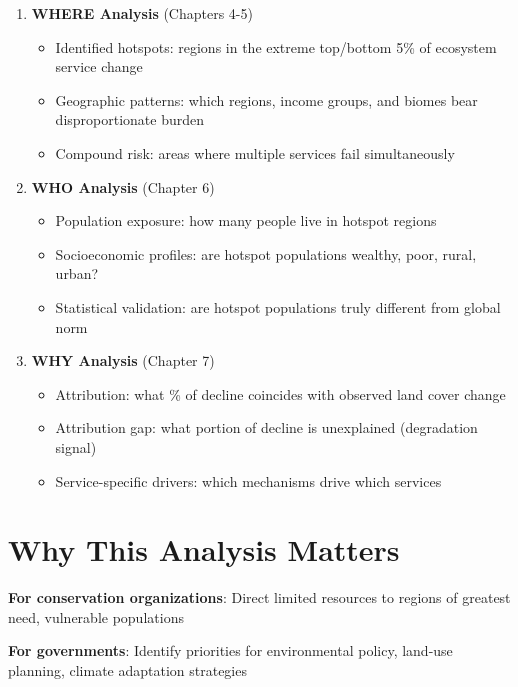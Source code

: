 \documentclass[
  letterpaper,
  DIV=11,
  numbers=noendperiod]{scrreprt}
\providecommand{\tightlist}{%
  \setlength{\itemsep}{0pt}\setlength{\parskip}{0pt}}
\begin{document}
\begin{enumerate}
\def\labelenumi{\arabic{enumi}.}
\tightlist
\item
  \textbf{WHERE Analysis} (Chapters 4-5)

  \begin{itemize}
  \tightlist
  \item
    Identified hotspots: regions in the extreme top/bottom 5\% of
    ecosystem service change
  \item
    Geographic patterns: which regions, income groups, and biomes bear
    disproportionate burden
  \item
    Compound risk: areas where multiple services fail simultaneously
  \end{itemize}
\item
  \textbf{WHO Analysis} (Chapter 6)

  \begin{itemize}
  \tightlist
  \item
    Population exposure: how many people live in hotspot regions
  \item
    Socioeconomic profiles: are hotspot populations wealthy, poor,
    rural, urban?
  \item
    Statistical validation: are hotspot populations truly different from
    global norm
  \end{itemize}
\item
  \textbf{WHY Analysis} (Chapter 7)

  \begin{itemize}
  \tightlist
  \item
    Attribution: what \% of decline coincides with observed land cover
    change
  \item
    Attribution gap: what portion of decline is unexplained (degradation
    signal)
  \item
    Service-specific drivers: which mechanisms drive which services
  \end{itemize}
\end{enumerate}

\section{Why This Analysis Matters}\label{why-this-analysis-matters}

\textbf{For conservation organizations}: Direct limited resources to
regions of greatest need, vulnerable populations

\textbf{For governments}: Identify priorities for environmental policy,
land-use planning, climate adaptation strategies
\end{document}
